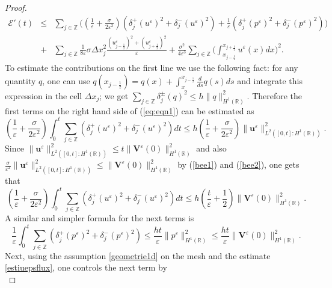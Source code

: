 \documentclass[a4paper,french,english,10pt]{article}
\newcommand\eps{\varepsilon}
\newcommand\V{\mathbf{V}}
\begin{document}
\begin{proof}
\begin{eqnarray} \label{eq:eqn1}
\mathscr{E}'(t)  & \leq & \sum_{j\in \mathbb{Z}} \bigg(
\left( \frac{1}{\eps}+\frac{\sigma}{2\eps^2}\right)\left ( 
\delta_{j}^+(u^{\eps})^2+\delta_{j}^-(u^{\eps})^2\right )
+\frac{1}{\eps}\left (
\delta_{j}^+(p^{\eps})^2+\delta_{j}^-(p^{\eps}
)^2\right ) \bigg) \\
&+& \underset{j\in \mathbb{Z}}{\sum} \frac{1}{8\eps} \sigma \Delta x_j^2
\frac{(u_{j-\frac12 }^{\eps})^2+(
u_{j+\frac12 }^{\eps})^2}{\eps}+\frac{\sigma^2}{4\eps^3} \sum_{j\in
\mathbb{Z}}\bigg( {\int_{x_{j-\frac12}}^{x_{j+\frac12}}} u^{\eps}(x) dx \bigg)^2.
\end{eqnarray} 
To estimate the contributions on the first line we use the following fact:
for any quantity $q$, one can use  $q(x_{j-\frac12})=q(x)+\int_x^{x_{j-\frac12}}\frac{d}{ds}q(s)ds$
 and integrate this
expression in the cell $\Delta x_j$; we
get $ \sum_{j\in \mathbb{Z}} \delta_{j}^\pm(q)^2\leq
h \| q \|_{H^1(\mathbb{R})}^2$. 
Therefore
the first terms on the right hand side of (\ref{eq:eqn1}) can be estimated as
$$
\left( \frac{1}{\eps}+\frac{\sigma}{2\eps^2}\right)
\int_0^t 
\sum_{j\in \mathbb{Z}} 
\left ( 
\delta_{j}^+(u^{\eps})^2+\delta_{j}^-(u^{\eps})^2\right )dt
\leq h \left( \frac{1}{\eps}+\frac{\sigma}{2\eps^2}\right)
\| \mathbf u^\eps  \|^2_{ L^2( [0,t] : H^1(\mathbb R)) }.
$$
Since $\| \mathbf u^\eps  \|^2_{ L^2( [0,t] : H^1(\mathbb R) )}\leq t \| \V^{\eps}(0) \|_{H^1(\mathbb{R})}^2$ and also 
$
\frac{\sigma}
{\eps^2}\| \mathbf u^\eps  \|^2_{ L^2( [0,t] : H^1(\mathbb R) )}\leq  \| \V^{\eps}(0) \|_{H^1(\mathbb{R})}^2$
by (\ref{bee1}) and (\ref{bee2}), one gets that
\begin{equation} \label{eq:sm1}
\left( \frac{1}{\eps}+\frac{\sigma}{2\eps^2}\right)
\int_0^t 
\sum_{j\in \mathbb{Z}} 
\left ( 
\delta_{j}^+(u^{\eps})^2+\delta_{j}^-(u^{\eps})^2\right )dt
\leq  h  \left( \frac{t}\eps+\frac{1}{2}\right)
\| \V^{\eps}(0) \|_{H^1(\mathbb{R})}^2.
\end{equation}
A similar and simpler formula for the next terms is
\begin{equation} \label{eq:sm2}
 \frac{1}{\eps}\int_0^t 
 \sum_{j\in \mathbb{Z}} 
 \left (
\delta_{j}^+(p^{\eps})^2+\delta_{j}^-(p^{\eps}
)^2\right ) \leq   \frac{ h t}\eps 
\|  p^\eps  \|^2_{  H^1(\mathbb R) }
\leq     \frac{ h t}\eps 
\| \V^{\eps}(0) \|_{H^1(\mathbb{R})}^2.
\end{equation}
Next, using the assumption \eqref{geometrie1d} on the mesh and the estimate \eqref{estiuepsflux}, one controls the next term by 
\begin{equation} \label{eq:sm3}

\end{equation}
\end{proof}
\end{document}
